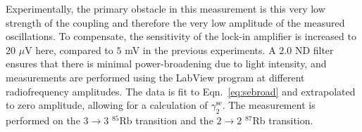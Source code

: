 Experimentally, the primary obstacle in this measurement is this very low strength of the coupling and therefore the very low amplitude of the measured oscillations. To compensate, the sensitivity of the lock-in amplifier is increased to $20$  $\mu$V here, compared to $5$ mV in the previous experiments. A $2.0$ ND filter ensures that there is minimal power-broadening due to light intensity, and measurements are performed using the LabView program at different radiofrequency amplitudes. The data is fit to Eqn.~\ref{eq:sebroad} and extrapolated to zero amplitude, allowing for a calculation of $\gamma_2^{\mathrm{se}}$. The measurement is performed on the $3\rightarrow3$  $^{85}$Rb transition and the $2\rightarrow2$ $^{87}$Rb transition. 











